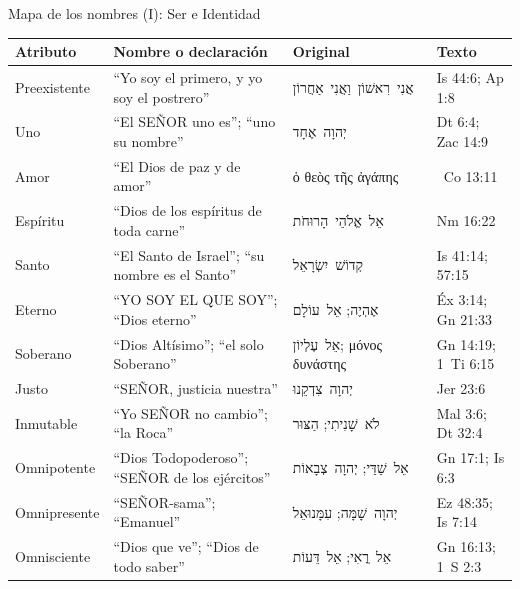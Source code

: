 \documentclass[hyperref={bookmarks=false},aspectratio=169]{beamer}
\newcommand{\heb}[1]{\mbox{\foreignlanguage{hebrew}{#1}}}
\newcommand{\grc}[1]{\foreignlanguage{ancientgreek}{#1}}
\newcommand{\SENOR}{SEÑOR}
\renewcommand{\arraystretch}{1.3}
\begin{document}
\begin{frame}{Mapa de los nombres (I): Ser e Identidad}
\tiny\renewcommand{\arraystretch}{1.1}
\begin{tabular}{@{}>{\RaggedRight\arraybackslash}p{1.6cm}>{\RaggedRight\arraybackslash}p{3.9cm}>{\RaggedRight\arraybackslash}p{3.1cm}>{\RaggedRight\arraybackslash}p{1.9cm}@{}}
\toprule
\textbf{Atributo} & \textbf{Nombre o declaración} & \textbf{Original} & \textbf{Texto} \\ \midrule
Preexistente & ``Yo soy el primero, y yo soy el postrero'' & \heb{אֲנִי רִאשׁוֹן וַאֲנִי אַחֲרוֹן} & Is 44:6; Ap 1:8 \\
Uno & ``El \SENOR{} uno es''; ``uno su nombre'' & \heb{יְהוָה אֶחָד} & Dt 6:4; Zac 14:9 \\
Amor & ``El Dios de paz y de amor'' & \grc{ὁ θεὸς τῆς ἀγάπης} & 2~Co 13:11 \\
Espíritu & ``Dios de los espíritus de toda carne'' & \heb{אֵל אֱלֹהֵי הָרוּחֹת} & Nm 16:22 \\ \midrule
Santo & ``El Santo de Israel''; ``su nombre es el Santo'' & \heb{קְדוֹשׁ יִשְׂרָאֵל} & Is 41:14; 57:15 \\
Eterno & ``YO SOY EL QUE SOY''; ``Dios eterno'' & \heb{אֶהְיֶה}; \heb{אֵל עוֹלָם} & Éx 3:14; Gn 21:33 \\
Soberano & ``Dios Altísimo''; ``el solo Soberano'' & \heb{אֵל עֶלְיוֹן}; \grc{μόνος δυνάστης} & Gn 14:19; 1~Ti 6:15 \\
Justo & ``\SENOR{}, justicia nuestra'' & \heb{יְהוָה צִדְקֵנוּ} & Jer 23:6 \\
Inmutable & ``Yo \SENOR{} no cambio''; ``la Roca'' & \heb{לֹא שָׁנִיתִי}; \heb{הַצּוּר} & Mal 3:6; Dt 32:4 \\
Omnipotente & ``Dios Todopoderoso''; ``\SENOR{} de los ejércitos'' & \heb{אֵל שַׁדַּי}; \heb{יְהוָה צְבָאוֹת} & Gn 17:1; Is 6:3 \\
Omnipresente & ``\SENOR{}-sama''; ``Emanuel'' & \heb{יְהוָה שָׁמָּה}; \heb{עִמָּנוּאֵל} & Ez 48:35; Is 7:14 \\
Omnisciente & ``Dios que ve''; ``Dios de todo saber'' & \heb{אֵל רֳאִי}; \heb{אֵל דֵּעוֹת} & Gn 16:13; 1~S 2:3 \\
\bottomrule
\end{tabular}
\end{frame}
\end{document}
